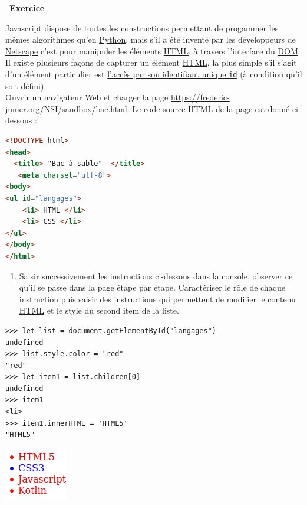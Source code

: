 \documentclass[
  11pt,
]{article}
\newcommand{\passthrough}[1]{#1}
\providecommand{\tightlist}{%
  \setlength{\itemsep}{0pt}\setlength{\parskip}{0pt}}
\newcounter{exo}
\newenvironment{exercice}[1]
{\par \medskip   \addtocounter{exo}{1} \noindent  
\begin{bclogo}[arrondi =0.1,   noborder = true, logo=\bccrayon, marge=4]{~\textbf{Exercice} \textbf{\theexo} {\itshape #1} }  \par}
{
\end{bclogo}
 \par \bigskip }
\newcounter{thme}
\newcounter{def}
\newcounter{alg}
\newcounter{prog}
\begin{document}
\begin{exercice}{}

\href{https://developer.mozilla.org/fr/docs/Glossaire/JavaScript}{Javascript}
dispose de toutes les constructions permettant de progammer les mêmes
algorithmes qu'en
\href{https://docs.python.org/3.7/library/cgi.html}{Python}, mais s'il a
été inventé par les développeurs de
\href{https://fr.wikipedia.org/wiki/Netscape_Navigator}{Netscape} c'est
pour manipuler les éléments
\href{https://developer.mozilla.org/fr/docs/Glossaire/HTML}{HTML}, à
travers l'interface du
\href{https://developer.mozilla.org/fr/docs/Glossaire/DOM}{DOM}. Il
existe plusieurs façons de capturer un élément
\href{https://developer.mozilla.org/fr/docs/Glossaire/HTML}{HTML}, la
plus simple s'il s'agit d'un élément particulier est
\href{https://www.w3schools.com/js/js_htmldom_methods.asp}{l'accès par
son identifiant unique \passthrough{\lstinline!id!}} (à condition qu'il
soit défini).\\
Ouvrir un navigateur Web et charger la page
\url{https://frederic-junier.org/NSI/sandbox/bac.html}. Le code source
\href{https://developer.mozilla.org/fr/docs/Glossaire/HTML}{HTML} de la
page est donné ci-dessous :

\begin{lstlisting}[language=HTML]
<!DOCTYPE html>
<head>
  <title> "Bac à sable"  </title>
   <meta charset="utf-8">
<body>
<ul id="langages">
    <li> HTML </li>
    <li> CSS </li>
</ul>
</body>
</html>
\end{lstlisting}

\begin{enumerate}
\def\labelenumi{\arabic{enumi}.}
\tightlist
\item
  Saisir successivement les instructions ci-dessous dans la console,
  observer ce qu'il se passe dans la page étape par étape. Caractériser
  le rôle de chaque instruction puis saisir des instructions qui
  permettent de modifier le contenu
  \href{https://developer.mozilla.org/fr/docs/Glossaire/HTML}{HTML} et
  le style du second item de la liste.
\end{enumerate}

\begin{lstlisting}
>>> let list = document.getElementById("langages")
undefined
>>> list.style.color = "red"
"red"
>>> let item1 = list.children[0]
undefined
>>> item1
<li>
>>> item1.innerHTML = 'HTML5'
"HTML5"
\end{lstlisting}

\includegraphics{images/exo2-fig1.png}\\


\end{exercice}
\end{document}
